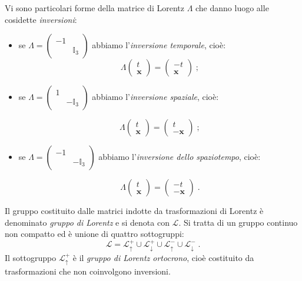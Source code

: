 Vi sono particolari forme della matrice di Lorentz $\Lambda$ che danno luogo alle cosidette \textit{inversioni}:
\begin{itemize}
 \item se $\Lambda=\left(\begin{matrix}
                       -1 & {} \\
{} & \mathbb{I}_3
                      \end{matrix}\right)$ abbiamo l'\textit{inversione temporale}, cioè:
\begin{equation}
\Lambda\begin{pmatrix}
t \\
\mathbf{x}
\end{pmatrix}=\begin{pmatrix}
-t \\
\mathbf{x}
\end{pmatrix}\;;
\end{equation}
\item se $\Lambda=\left(\begin{matrix}
                         1 & {} \\
{} & -\mathbb{I}_3
                        \end{matrix}\right)$ abbiamo l'\textit{inversione spaziale}, cioè:
                        
\begin{equation}
\Lambda\begin{pmatrix}
t \\
\mathbf{x}
\end{pmatrix}=\begin{pmatrix}
t \\
-\mathbf{x}
\end{pmatrix}\;;
\end{equation}
\item se $\Lambda=\left(\begin{matrix}
                         -1 & {} \\
{} & -\mathbb{I}_3
                        \end{matrix}\right)$ abbiamo l'\textit{inversione dello spaziotempo}, cioè:

\begin{equation}
\Lambda\begin{pmatrix}
t \\
\mathbf{x}
\end{pmatrix}=\begin{pmatrix}
-t \\
-\mathbf{x}
\end{pmatrix}\;.
\end{equation}
\end{itemize}
Il gruppo costituito dalle matrici indotte da trasformazioni di Lorentz è denominato \textit{gruppo di Lorentz} e si denota con 
$\mathcal{L}$. Si tratta di un gruppo continuo non compatto ed è unione di quattro sottogruppi:
$$
\mathcal{L}=\mathcal{L}^+_{\uparrow}\cup\mathcal{L}^+_{\downarrow}\cup\mathcal{L}^-_{\uparrow}\cup\mathcal{L}^-_{\downarrow}\;.
$$
Il sottogruppo $\mathcal{L}^+_{\uparrow}$ è il \textit{gruppo di Lorentz ortocrono}, cioè costituito da trasformazioni che non 
coinvolgono inversioni.

